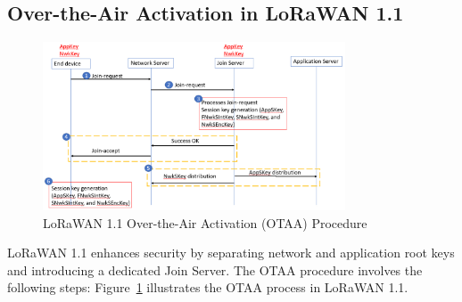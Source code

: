 \subsection{Over-the-Air Activation in LoRaWAN 1.1}
\begin{figure}[htbp]
    \centering
    \includegraphics[width=0.8\textwidth]{figures/otaa-1.1.png}
    \caption{LoRaWAN 1.1 Over-the-Air Activation (OTAA) Procedure}
    \label{fig:lora_otaa_1.1}
\end{figure}
LoRaWAN 1.1 enhances security by separating network and application root keys and introducing a dedicated Join Server. The OTAA procedure involves the following steps:
Figure~\ref{fig:lora_otaa_1.1} illustrates the OTAA process in LoRaWAN 1.1.

